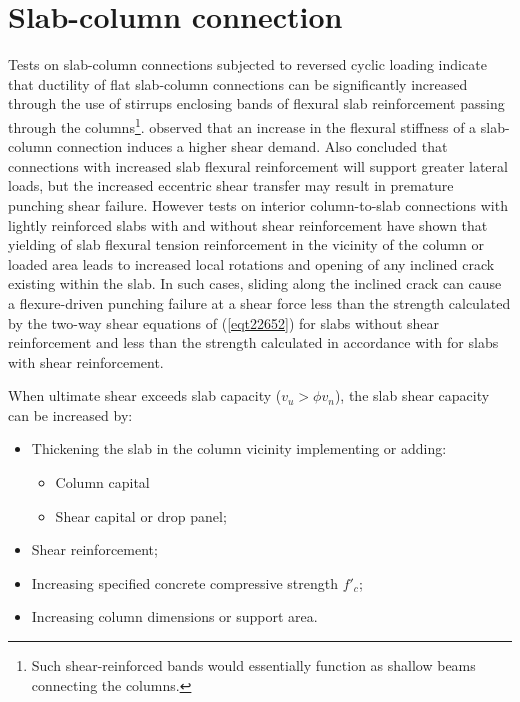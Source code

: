 \section{Slab-column connection}
Tests on slab-column connections subjected to reversed cyclic loading\citep{carpenter1973design,symonds1976slab} indicate that ductility of flat slab-column connections can be significantly increased through the use of stirrups enclosing bands of flexural slab reinforcement passing through the columns\footnote{Such shear-reinforced bands would essentially function as shallow beams connecting the columns.}. \citep{Robertson2006} observed that an increase in the flexural stiffness of a slab-column connection induces a higher shear demand. Also \citep{Robertson2006} concluded that connections with increased slab flexural reinforcement will support greater lateral loads, but the increased eccentric shear transfer may result in premature punching shear failure. However tests on interior column-to-slab connections with lightly reinforced slabs with and without shear reinforcement \citep{peiris2012flexural,hawkins2017effect,bayrak2009two,muttoni2008punching,dam2017behavior,muttoni2008punching} have shown that yielding of slab flexural tension reinforcement in the vicinity of the column or loaded area leads to increased local rotations and opening of any inclined crack existing within the slab. In such cases, sliding along the inclined crack can cause a flexure-driven punching failure at a shear force less than the strength calculated by the two-way shear equations of \citet[Table 22.6.5.2]{aci31819} (\ref{eqt22652}) for slabs without shear reinforcement and less than the strength calculated in accordance with \citet[Section 22.6.6.3]{aci31819} for slabs with shear reinforcement. 

When ultimate shear exceeds slab capacity ($v_u>\phi v_n$), the slab shear capacity can be increased by:\begin{itemize}
\item Thickening the slab in the column vicinity implementing or adding:
\begin{itemize}
\item Column capital
\item Shear capital or drop panel;
\end{itemize}
\item Shear reinforcement;
\item Increasing specified concrete compressive strength $f'_c$;
\item Increasing column dimensions or support area.
\end{itemize}

